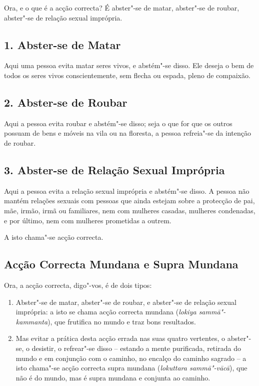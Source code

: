 

Ora, e o que é a acção correcta? É abster"-se de matar, abster"-se de roubar,
abster"-se de relação sexual imprópria.


\subsection{1. Abster-se de Matar}

Aqui uma pessoa evita matar seres vivos, e abstém"-se disso. Ele deseja o bem de
todos os seres vivos conscientemente, sem flecha ou espada, pleno de compaixão.

\subsection{2. Abster-se de Roubar}

Aqui a pessoa evita roubar e abstém"-se disso; seja o que for que os outros
possuam de bens e móveis na vila ou na floresta, a pessoa refreia"-se da intenção
de roubar.

\subsection{3. Abster-se de Relação Sexual Imprópria}

Aqui a pessoa evita a relação sexual imprópria e abstém"-se disso. A pessoa não
mantém relações sexuais com pessoas que ainda estejam sobre a protecção de pai,
mãe, irmão, irmã ou familiares, nem com mulheres casadas, mulheres condenadas, e
por último, nem com mulheres prometidas a outrem.

A isto chama"-se acção correcta.


\subsection{Acção Correcta Mundana e Supra Mundana}

Ora, a acção correcta, digo"-vos, é de dois tipos:

\begin{enumerate}

  \item Abster"-se de matar, abster"-se de roubar, e abster"-se de relação sexual
        imprópria: a isto se chama acção correcta mundana (\emph{lokiya
        sammā"-kammanta}), que frutifica no mundo e traz bons resultados.

  \item Mas evitar a prática desta acção errada nas suas quatro vertentes, o
        abster"-se, o desistir, o refrear"-se disso -- estando a mente purificada,
        retirada do mundo e em conjunção com o caminho, no encalço do caminho
        sagrado -- a isto chama"-se acção correcta supra mundana (\emph{lokuttara
        sammā"-vācā}), que não é do mundo, mas é supra mundana e conjunta ao
        caminho.

\end{enumerate}

